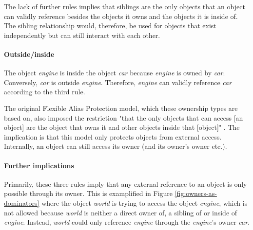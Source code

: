 \documentclass[sigplan,11pt,nonacm]{acmart}
\begin{document}
The lack of further rules implies that siblings are the only objects that an object can validly reference besides the objects it owns and the objects it is inside of.
The sibling relationship would, therefore, be used for objects that exist independently but can still interact with each other.

\paragraph{Outside/inside}

The object \emph{engine} is inside the object \emph{car} because \emph{engine} is owned by \emph{car}.
Conversely, \emph{car} is outside \emph{engine}.
Therefore, \emph{engine} can validly reference \emph{car} according to the third rule.

The original Flexible Alias Protection model, which these ownership types are based on, also imposed the restriction "that the only objects that can access [an object] are the object that owns it and other objects inside that [object]" \cite{flexible-alias-protection}.
The implication is that this model only protects objects from external access.
Internally, an object can still access its owner (and its owner's owner etc.).



\paragraph{Further implications}

Primarily, these three rules imply that any external reference to an object is only possible through its owner.
This is examplified in Figure \ref{fig:owners-as-dominators} where the object \emph{world} is trying to access the object \emph{engine}, which is not allowed because \emph{world} is neither a direct owner of, a sibling of or inside of \emph{engine}.
Instead, \emph{world} could only reference \emph{engine} through the \emph{engine}'s owner \emph{car}.
\end{document}
